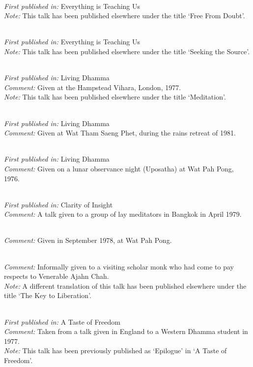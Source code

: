  \\
\textit{First published in:} Everything is Teaching Us \\
\textit{Note:} This talk has been published elsewhere under the title `Free From Doubt'.

 \\
\textit{First published in:} Everything is Teaching Us \\
\textit{Note:} This talk has been published elsewhere under the title `Seeking the Source'.

 \\
\textit{First published in:} Living Dhamma \\
\textit{Comment:} Given at the Hampstead Vihara, London, 1977. \\
\textit{Note:} This talk has been published elsewhere under the title `Meditation'.

 \\
\textit{First published in:} Living Dhamma \\
\textit{Comment:} Given at Wat Tham Saeng Phet, during the rains retreat of 1981.

 \\
\textit{First published in:} Living Dhamma \\
\textit{Comment:} Given on a lunar observance night (Uposatha) at Wat Pah Pong, 1976.

 \\
\textit{First published in:} Clarity of Insight \\
\textit{Comment:} A talk given to a group of lay meditators in Bangkok in April 1979.

 \\
\textit{Comment:} Given in September 1978, at Wat Pah Pong.

 \\
\textit{Comment:} Informally given to a visiting scholar monk who had come to pay respects to Venerable Ajahn Chah. \\
\textit{Note:} A different translation of this talk has been published elsewhere under the title `The Key to Liberation'.

 \\
\textit{First published in:} A Taste of Freedom \\
\textit{Comment:} Taken from a talk given in England to a Western Dhamma student in 1977. \\
\textit{Note:} This talk has been previously published as `Epilogue' in `A Taste of Freedom'.

